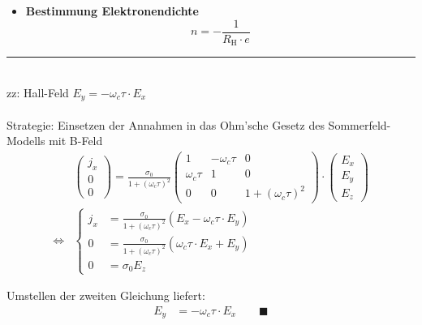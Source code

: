 \documentclass{article}
\newcommand{\lr}[1]{\left(#1\right)}
\begin{document}
	\begin{itemize}
		\item \textbf{Bestimmung Elektronendichte}
			\begin{equation}
				n = -\frac{1}{R_\text{H} \cdot e}
			\end{equation}
	\end{itemize}


\newpage


{\color{violet}
\hrule
	\\
	zz: Hall-Feld $E_y = -\omega_c \tau \cdot E_x$\\
	\\
	Strategie: Einsetzen der Annahmen in das Ohm'sche Gesetz des Sommerfeld-Modells mit B-Feld
		\begin{align*}
			&\begin{pmatrix}
				j_x \\ 0 \\ 0
			\end{pmatrix}
			=
			\frac{\sigma_0}{1 + (\omega_c\tau)^2}
			\begin{pmatrix}
				1 & -\omega_c\tau & 0 \\
				\omega_c\tau & 1 & 0 \\
				0 & 0 & 1 + (\omega_c\tau)^2
			\end{pmatrix}
			\cdot
			\begin{pmatrix}
				E_x \\ E_y \\ E_z
			\end{pmatrix} \\
			\Leftrightarrow &
			\begin{cases}
				j_x &= \frac{\sigma_0}{1 + (\omega_c\tau)^2} \lr{ E_x - \omega_c\tau \cdot E_y } \\
				0 &= \frac{\sigma_0}{1 + (\omega_c\tau)^2} \lr{ \omega_c\tau \cdot E_x + E_y } \\
				0 &= \sigma_0 E_z
			\end{cases}
		\end{align*}
	
	Umstellen der zweiten Gleichung liefert:
		\begin{align*}
			E_y &= -\omega_c\tau \cdot E_x \qquad \blacksquare
		\end{align*}


}
\end{document}
